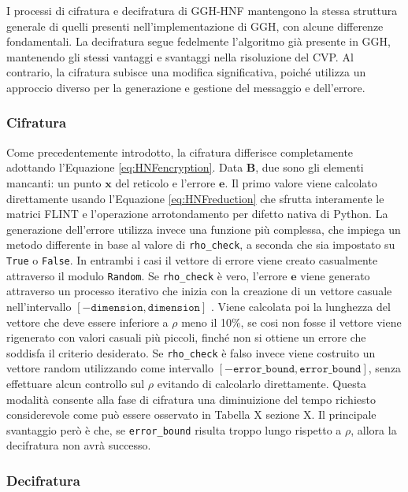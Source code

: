 I processi di cifratura e decifratura di GGH-HNF mantengono la stessa struttura generale 
di quelli presenti nell'implementazione di GGH, con alcune differenze fondamentali. 
La decifratura segue 
fedelmente l'algoritmo già presente in GGH, mantenendo gli stessi vantaggi e svantaggi
nella risoluzione del CVP. Al contrario, la cifratura subisce una modifica significativa, 
poiché utilizza un approccio diverso per la generazione e gestione del messaggio e 
dell'errore.

\subsubsection{Cifratura}

Come precedentemente introdotto, la cifratura differisce completamente adottando 
l'Equazione \ref{eq:HNFencryption}. Data $\mathbf{B}$, due sono gli elementi mancanti: un punto $\mathbf{x}$ 
del reticolo e l'errore $\mathbf{e}$. Il primo valore viene calcolato direttamente usando
l'Equazione \ref{eq:HNFreduction}  che sfrutta interamente le matrici FLINT e l'operazione 
arrotondamento per difetto nativa di Python. 
La generazione dell'errore utilizza invece una funzione più complessa, che impiega un 
metodo differente in base al valore di \texttt{rho\_check}, a seconda che sia impostato 
su \texttt{True} o \texttt{False}. In entrambi i casi il vettore di errore viene creato 
casualmente attraverso il modulo \texttt{Random}. 
Se \texttt{rho\_check} è vero, l'errore $\mathbf{e}$ viene 
generato attraverso un processo iterativo che inizia con la creazione di un vettore 
casuale nell'intervallo $[-\texttt{dimension}, \texttt{dimension}]$ .
 Viene calcolata poi la lunghezza del vettore che deve essere inferiore
a $\rho$ meno il 10\%, se cosi non fosse il vettore 
viene rigenerato con valori casuali più piccoli, finché non si ottiene un errore che 
soddisfa il criterio desiderato. Se \texttt{rho\_check} è falso invece viene costruito un
vettore random utilizzando come intervallo $[-\texttt{error\_bound}, \texttt{error\_bound}]$,
senza effettuare alcun controllo sul $\rho$ evitando di calcolarlo direttamente. Questa
modalità consente alla fase di cifratura una diminuizione del tempo richiesto considerevole
come può essere osservato in Tabella X sezione X. Il principale svantaggio però è che, se
\texttt{error\_bound} risulta troppo lungo rispetto a $\rho$, allora la decifratura non 
avrà successo. 

\subsubsection{Decifratura}

